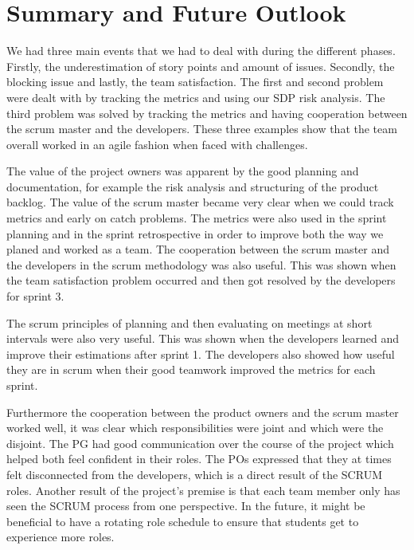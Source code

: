 \documentclass{article}
\begin{document}
\section{Summary and Future Outlook}

We had three main events that we had to deal with during the different phases. Firstly, the underestimation of story points and amount of issues. Secondly, the blocking issue and lastly, the team satisfaction. The first and second problem were dealt with by tracking the metrics and using our SDP risk analysis. The third problem was solved by tracking the metrics and having cooperation between the scrum master and the developers. These three examples show that the team overall worked in an agile fashion when faced with challenges. %

The value of the project owners was apparent by the good planning and documentation, for example the risk analysis and structuring of the product backlog. The value of the scrum master became very clear when we could track metrics and early on catch problems. The metrics were also used in the sprint planning and in the sprint retrospective in order to improve both the way we planed and worked as a team.  The cooperation between the scrum master and the developers in the scrum methodology was also useful. This was shown when the team satisfaction problem occurred and then got resolved by the developers for sprint 3.

The scrum principles of planning and then evaluating on meetings at short intervals were also very useful. This was shown when the developers learned and improve their estimations after sprint 1. The developers also showed how useful they are in scrum when their good teamwork improved the metrics for each sprint.

Furthermore the cooperation between the product owners and the scrum master worked well, it was clear which responsibilities were joint and which were the disjoint. The PG had good communication over the course of the project which helped both feel confident in their roles. The POs expressed that they at times felt disconnected from the developers, which is a direct result of the SCRUM roles. Another result of the project's premise is that each team member only has seen the SCRUM process from one perspective. In the future, it might be beneficial to have a rotating role schedule to ensure that students get to experience more roles. 
\end{document}
